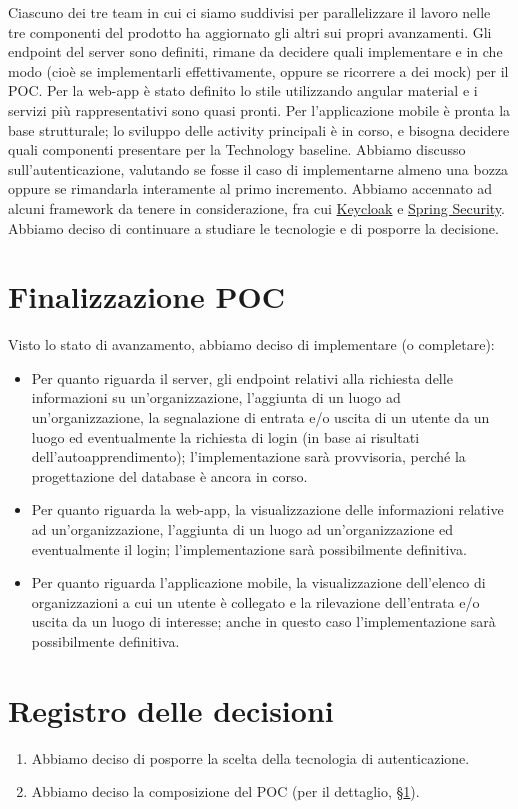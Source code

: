 \documentclass{article}
\begin{document}
Ciascuno dei tre team in cui ci siamo suddivisi per parallelizzare il lavoro nelle tre componenti del prodotto ha aggiornato gli altri sui propri avanzamenti.
Gli endpoint del server sono definiti, rimane da decidere quali implementare e in che modo (cioè se implementarli effettivamente, oppure se ricorrere a dei mock) per il POC\@.
Per la web-app è stato definito lo stile utilizzando angular material e i servizi più rappresentativi sono quasi pronti.
Per l'applicazione mobile è pronta la base strutturale; lo sviluppo delle activity principali è in corso, e bisogna decidere quali componenti presentare per la Technology baseline.
Abbiamo discusso sull'autenticazione, valutando se fosse il caso di implementarne almeno una bozza oppure se rimandarla interamente al primo incremento.
Abbiamo accennato ad alcuni framework da tenere in considerazione, fra cui \href{https://www.keycloak.org/}{Keycloak} e \href{https://spring.io/projects/spring-security}{Spring Security}.
Abbiamo deciso di continuare a studiare le tecnologie e di posporre la decisione.

\section{Finalizzazione POC}%
\label{sec:finalizzazione_poc}

Visto lo stato di avanzamento, abbiamo deciso di implementare (o completare):
\begin{itemize}
  \item Per quanto riguarda il server, gli endpoint relativi alla richiesta delle informazioni su un'organizzazione, l'aggiunta di un luogo ad un'organizzazione, la segnalazione di entrata e/o uscita di un utente da un luogo ed eventualmente la richiesta di login (in base ai risultati dell'autoapprendimento); l'implementazione sarà provvisoria, perché la progettazione del database è ancora in corso.
  \item Per quanto riguarda la web-app, la visualizzazione delle informazioni relative ad un'organizzazione, l'aggiunta di un luogo ad un'organizzazione ed eventualmente il login; l'implementazione sarà possibilmente definitiva.
  \item Per quanto riguarda l'applicazione mobile, la visualizzazione dell'elenco di organizzazioni a cui un utente è collegato e la rilevazione dell'entrata e/o uscita da un luogo di interesse; anche in questo caso l'implementazione sarà possibilmente definitiva.
\end{itemize}

\newpage
\section{Registro delle decisioni}%
\label{sec:registro_delle_decisioni}

\begin{enumerate}
  \item Abbiamo deciso di posporre la scelta della tecnologia di autenticazione.
  \item Abbiamo deciso la composizione del POC (per il dettaglio, §\ref{sec:finalizzazione_poc}).
\end{enumerate}

\end{document}
